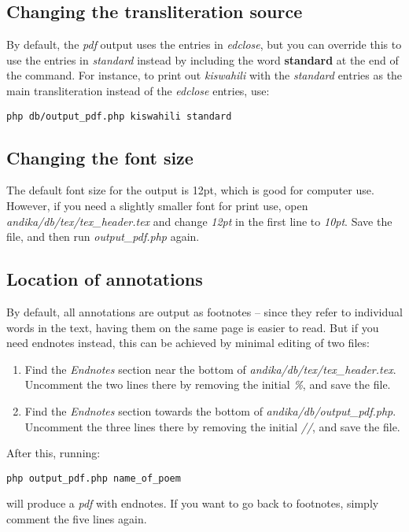 \subsection{Changing the transliteration source}

By default, the \textit{pdf} output uses the entries in \textit{edclose}, but you can override this to use the entries in \textit{standard} instead by including the word \textbf{standard} at the end of the command.  For instance, to print out \textit{kiswahili} with the \textit{standard} entries as the main transliteration instead of the \textit{edclose} entries, use:

\verb|php db/output_pdf.php kiswahili standard|


\subsection{Changing the font size}

The default font size for the output is 12pt, which is good for computer use.  However, if you need a slightly smaller font for print use, open \textit{andika/db/tex/tex_header.tex} and change \textit{12pt} in the first line to \textit{10pt}.  Save the file, and then run \textit{output_pdf.php} again.


\subsection{Location of annotations}

By default, all annotations are output as footnotes -- since they refer to individual words in the text, having them on the same page is easier to read.  But if you need endnotes instead, this can be achieved by minimal editing of two files:
\begin{enumerate}
\item Find the \textit{Endnotes} section near the bottom of \textit{andika/db/tex/tex_header.tex}.  Uncomment the two lines there by removing the initial \textit{\%}, and save the file.
\item Find the \textit{Endnotes} section towards the bottom of \textit{andika/db/output_pdf.php}.  Uncomment the three lines there by removing the initial \textit{//}, and save the file.
\end{enumerate}

After this, running:

\verb|php output_pdf.php name_of_poem|

will produce a \textit{pdf} with endnotes.  If you want to go back to footnotes, simply comment the five lines again.





